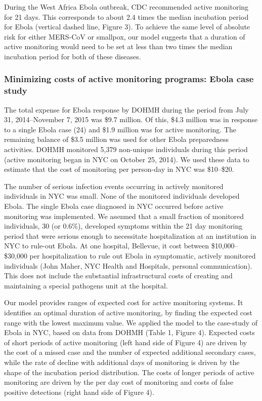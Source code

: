\documentclass[]{article}
\begin{document}
During the West Africa Ebola outbreak, CDC recommended active monitoring
for 21 days. This corresponds to about 2.4 times the median incubation
period for Ebola (vertical dashed line, Figure 3). To achieve the same
level of absolute risk for either MERS-CoV or smallpox, our model
suggests that a duration of active monitoring would need to be set at
less than two times the median incubation period for both of these
diseases.

\subsubsection{Minimizing costs of active monitoring programs: Ebola
case
study}\label{minimizing-costs-of-active-monitoring-programs-ebola-case-study}

The total expense for Ebola response by DOHMH during the period from
July 31, 2014--November 7, 2015 was \$9.7 million. Of this, \$4.3
million was in response to a single Ebola case (24) and \$1.9 million
was for active monitoring. The remaining balance of \$3.5 million was
used for other Ebola preparedness activities. DOHMH monitored 5,379
non-unique individuals during this period (active monitoring began in
NYC on October 25, 2014). We used these data to estimate that the cost
of monitoring per person-day in NYC was \$10--\$20.

The number of serious infection events occurring in actively monitored
individuals in NYC was small. None of the monitored individuals
developed Ebola. The single Ebola case diagnosed in NYC occurred before
active monitoring was implemented. We assumed that a small fraction of
monitored individuals, 30 (or 0.6\%), developed symptoms within the 21
day monitoring period that were serious enough to necessitate
hospitalization at an institution in NYC to rule-out Ebola. At one
hospital, Bellevue, it cost between \$10,000--\$30,000 per
hospitalization to rule out Ebola in symptomatic, actively monitored
individuals (John Maher, NYC Health and Hospitals, personal
communication). This does not include the substantial infrastructural
costs of creating and maintaining a special pathogens unit at the
hospital.

Our model provides ranges of expected cost for active monitoring
systems. It identifies an optimal duration of active monitoring, by
finding the expected cost range with the lowest maximum value. We
applied the model to the case-study of Ebola in NYC, based on data from
DOHMH (Table 1, Figure 4). Expected costs of short periods of active
monitoring (left hand side of Figure 4) are driven by the cost of a
missed case and the number of expected additional secondary cases, while
the rate of decline with additional days of monitoring is driven by the
shape of the incubation period distribution. The costs of longer periods
of active monitoring are driven by the per day cost of monitoring and
costs of false positive detections (right hand side of Figure 4).
\end{document}
